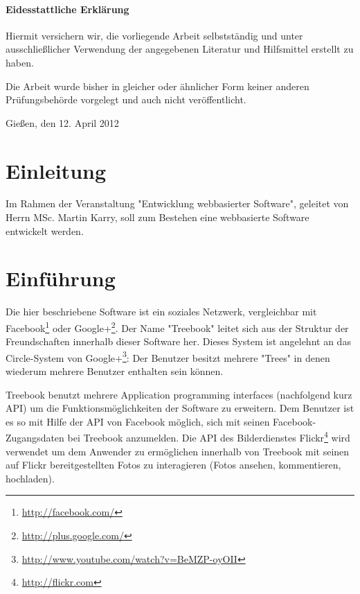 \documentclass[10pt,a4paper]{book}
\begin{document}
\begin{titlepage}
\subsubsection{Eidesstattliche Erklärung}
Hiermit versichern wir, die vorliegende Arbeit selbstständig und unter ausschließlicher Verwendung der angegebenen Literatur und Hilfsmittel erstellt zu haben.

Die Arbeit wurde bisher in gleicher oder ähnlicher Form keiner anderen Prüfungsbehörde vorgelegt und auch nicht veröffentlicht.

\bigskip
\bigskip
\bigskip
\bigskip
\bigskip
Gießen, den 12. April 2012
\end{titlepage}
\setcounter{page}{1}

\tableofcontents
\renewcommand{\chaptername}{}
\renewcommand{\thechapter}{}
\renewcommand{\thesection}{\arabic{section}}
\renewcommand{\thefigure}{\arabic{figure}}

\chapter{Einleitung}
Im Rahmen der Veranstaltung "Entwicklung webbasierter Software", geleitet von Herrn MSc. Martin Karry, soll zum Bestehen eine webbasierte Software entwickelt werden.
\chapter{Einführung}
Die hier beschriebene Software ist ein soziales Netzwerk, vergleichbar mit Facebook\footnote{\href{http://facebook.com/}{http://facebook.com/}
} oder Google+\footnote{\href{http://plus.google.com/}{http://plus.google.com/}}. Der Name "Treebook" leitet sich aus der Struktur der 
Freundschaften innerhalb dieser Software her. Dieses System ist angelehnt an das Circle-System von Google+\footnote{\href{http://www.youtube.
com/watch?v=BeMZP-oyOII}{http://www.youtube.com/watch?v=BeMZP-oyOII}}: Der Benutzer besitzt mehrere "Trees" in denen wiederum 
mehrere Benutzer enthalten sein können.

Treebook benutzt mehrere Application programming interfaces (nachfolgend kurz API) um die Funktionsmöglichkeiten der Software zu erweitern. 
Dem Benutzer ist es so mit Hilfe der API von Facebook möglich, sich mit seinen Facebook-Zugangsdaten bei Treebook anzumelden. Die API des 
Bilderdienstes Flickr\footnote{\href{http://flickr.com}{http://flickr.com}} wird verwendet um dem Anwender zu ermöglichen innerhalb von 
Treebook mit seinen auf Flickr bereitgestellten Fotos zu interagieren (Fotos ansehen, kommentieren, hochladen).
\end{document}
